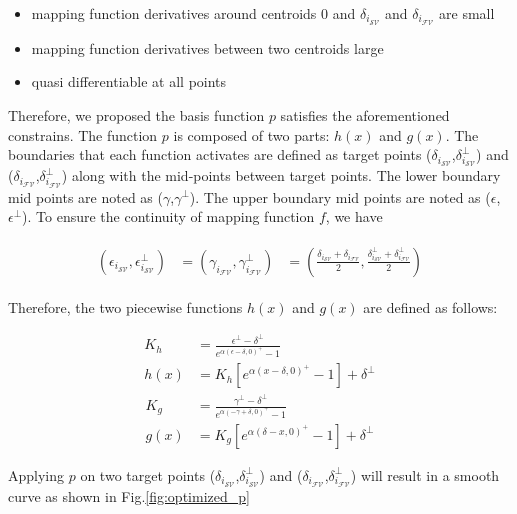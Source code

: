 \begin{itemize}
\item mapping function derivatives around centroids 0 and $\delta_{i_{{\mathcal{SV}}}}$ and $\delta_{i_{{\mathcal{FV}}}}$ are small
\item mapping function derivatives between two centroids large
\item quasi differentiable at all points
\end{itemize}

Therefore, we proposed the basis function $p$ satisfies the aforementioned constrains. The function $p$ is composed of two parts: $h(x)$ and $g(x)$. The boundaries that each function activates are defined as target points ($\delta_{i_{{\mathcal{SV}}}}$,$\delta^{\perp}_{i_{{\mathcal{SV}}}}$) and ($\delta_{i_{{\mathcal{FV}}}}$,$\delta^{\perp}_{i_{{\mathcal{FV}}}}$) along with the mid-points between target points. The lower boundary mid points are noted as ($\gamma$,$\gamma^{\perp}$). The upper boundary mid points are noted as ($\epsilon$,$\epsilon^{\perp}$). To ensure the continuity of mapping function $f$, we have

\begin{align}
\begin{aligned}
(\epsilon_{i_{{\mathcal{SV}}}},\epsilon^{\perp}_{i_{{\mathcal{SV}}}}) &=
(\gamma_{i_{{\mathcal{FV}}}},\gamma^{\perp}_{i_{{\mathcal{FV}}}}) &=
(\frac{\delta_{i_{{\mathcal{SV}}}} + \delta_{i_{{\mathcal{FV}}}}}{2}, \frac{\delta^{\perp}_{i_{{\mathcal{SV}}}} + \delta^{\perp}_{i_{{\mathcal{FV}}}}}{2})
\end{aligned}
\end{align}

Therefore, the two piecewise functions $h(x)$ and $g(x)$ are defined as follows:

\begin{align}
K_h &= \frac{\epsilon^{\perp}-\delta^{\perp}}{e^{\alpha(\epsilon-\delta,0)^{+}}-1}\\ \nonumber
h(x) &= K_h[e^{\alpha(x-\delta,0)^{+}}-1] + \delta^{\perp}
\end{align}
\begin{align}
K_g &= \frac{\gamma^{\perp}-\delta^{\perp}}{e^{\alpha(-\gamma+\delta,0)^{+}}-1}\\ \nonumber
g(x) &= K_g[e^{\alpha(\delta-x,0)^{+}}-1] + \delta^{\perp}
\end{align}

Applying $p$ on two target points ($\delta_{i_{{\mathcal{SV}}}}$,$\delta^{\perp}_{i_{{\mathcal{SV}}}}$) and ($\delta_{i_{{\mathcal{FV}}}}$,$\delta^{\perp}_{i_{{\mathcal{FV}}}}$) will result in a smooth curve as shown in Fig.\ref{fig:optimized_p}

